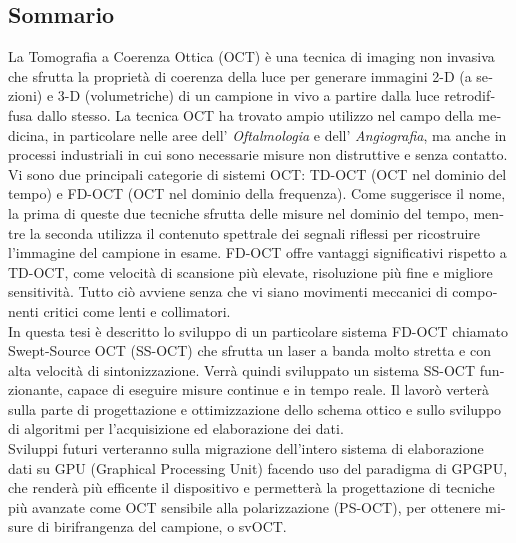 \begin{otherlanguage}{italian}
\chapter*{Sommario}
La Tomografia a Coerenza Ottica (\acs{OCT}) è una tecnica di imaging non invasiva che sfrutta la proprietà di coerenza della luce per generare immagini 2-D (a sezioni) e 3-D (volumetriche) di un campione in vivo a partire dalla luce retrodiffusa dallo stesso. La tecnica OCT ha trovato ampio utilizzo nel campo della medicina, in particolare nelle aree dell' \emph{Oftalmologia} e dell' \emph{Angiografia}, ma anche in processi industriali in cui sono necessarie misure non distruttive e senza
contatto. \\

\noindent Vi sono due principali categorie di sistemi OCT: TD-OCT (OCT nel dominio del tempo) e FD-OCT (OCT nel dominio della frequenza). Come suggerisce il nome, la prima di queste due tecniche sfrutta delle misure nel dominio del tempo, mentre la seconda utilizza il contenuto spettrale dei segnali riflessi per ricostruire l'immagine del campione in esame. FD-OCT offre vantaggi significativi rispetto a TD-OCT, come velocità di scansione più elevate, risoluzione più fine e migliore
sensitività. Tutto ciò avviene senza che vi siano movimenti meccanici di componenti critici come lenti e collimatori. \\

\noindent In questa tesi è descritto lo sviluppo di un particolare sistema FD-OCT chiamato Swept-Source OCT (\ac{SS-OCT}) che sfrutta un laser a banda molto stretta e con alta velocità di sintonizzazione. Verrà quindi sviluppato un sistema SS-OCT funzionante, capace di eseguire misure continue e in tempo reale. Il lavorò verterà sulla parte di progettazione e ottimizzazione dello schema ottico e sullo sviluppo di algoritmi per l'acquisizione ed elaborazione dei dati. \\

\noindent Sviluppi futuri verteranno sulla migrazione dell'intero sistema di elaborazione dati su GPU (Graphical Processing Unit) facendo uso del paradigma di \acf {GPGPU}, che renderà più efficente il dispositivo e permetterà la progettazione di tecniche più avanzate come OCT sensibile alla polarizzazione (\acs{PS-OCT}), per ottenere misure di birifrangenza del campione, o \acf{svOCT}.
\end{otherlanguage}

\endgroup

\vfill
